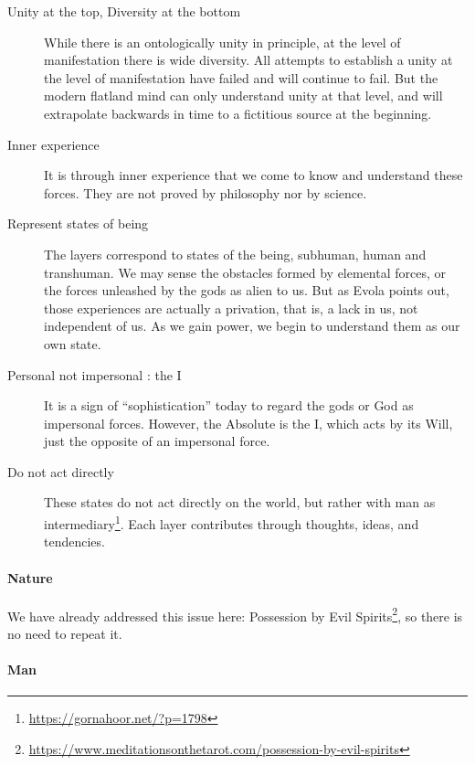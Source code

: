 \begin{description}

\item[Unity at the top, Diversity at the bottom]

While there is an ontologically unity in principle, at the level of manifestation there is wide diversity. All attempts to establish a unity at the level of manifestation have failed and will continue to fail. But the modern flatland mind can only understand unity at that level, and will extrapolate backwards in time to a fictitious source at the beginning.
\item[Inner experience]

It is through inner experience that we come to know and understand these forces. They are not proved by philosophy nor by science.
\item[Represent states of being]

The layers correspond to states of the being, subhuman, human and transhuman. We may sense the obstacles formed by elemental forces, or the forces unleashed by the gods as alien to us. But as Evola points out, those experiences are actually a privation, that is, a lack in us, not independent of us. As we gain power, we begin to understand them as our own state.
\item[Personal not impersonal : the I]

It is a sign of ``sophistication'' today to regard the gods or God as impersonal forces. However, the Absolute is the I, which acts by its Will, just the opposite of an impersonal force.
\item[Do not act directly]

These states do not act directly on the world, but rather with man as intermediary\footnote{\url{https://gornahoor.net/?p=1798}}. Each layer contributes through thoughts, ideas, and tendencies.
\end{description}


\paragraph{Nature}


We have already addressed this issue here: Possession by Evil Spirits\footnote{\url{https://www.meditationsonthetarot.com/possession-by-evil-spirits}}, so there is no need to repeat it.

\paragraph{Man}


